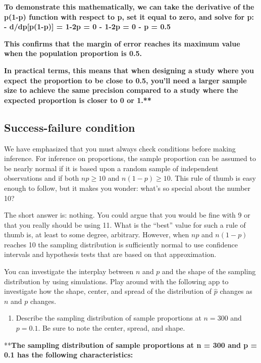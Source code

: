 \documentclass[
]{article}
\providecommand{\tightlist}{%
  \setlength{\itemsep}{0pt}\setlength{\parskip}{0pt}}
\begin{document}
\textbf{To demonstrate this mathematically, we can take the derivative
of the p(1-p) function with respect to p, set it equal to zero, and
solve for p: - d/dp{[}p(1-p){]} = 1-2p = 0 - 1-2p = 0 - p = 0.5}

\textbf{This confirms that the margin of error reaches its maximum value
when the population proportion is 0.5.}

\textbf{In practical terms, this means that when designing a study where
you expect the proportion to be close to 0.5, you'll need a larger
sample size to achieve the same precision compared to a study where the
expected proportion is closer to 0 or 1.**}

\subsection{Success-failure condition}\label{success-failure-condition}

We have emphasized that you must always check conditions before making
inference. For inference on proportions, the sample proportion can be
assumed to be nearly normal if it is based upon a random sample of
independent observations and if both \(np \geq 10\) and
\(n(1 - p) \geq 10\). This rule of thumb is easy enough to follow, but
it makes you wonder: what's so special about the number 10?

The short answer is: nothing. You could argue that you would be fine
with 9 or that you really should be using 11. What is the ``best'' value
for such a rule of thumb is, at least to some degree, arbitrary.
However, when \(np\) and \(n(1-p)\) reaches 10 the sampling distribution
is sufficiently normal to use confidence intervals and hypothesis tests
that are based on that approximation.

You can investigate the interplay between \(n\) and \(p\) and the shape
of the sampling distribution by using simulations. Play around with the
following app to investigate how the shape, center, and spread of the
distribution of \(\hat{p}\) changes as \(n\) and \(p\) changes.

\begin{enumerate}
\def\labelenumi{\arabic{enumi}.}
\setcounter{enumi}{5}
\tightlist
\item
  Describe the sampling distribution of sample proportions at
  \(n = 300\) and \(p = 0.1\). Be sure to note the center, spread, and
  shape.
\end{enumerate}

**\textbf{The sampling distribution of sample proportions at n = 300 and
p = 0.1 has the following characteristics:}
\end{document}
